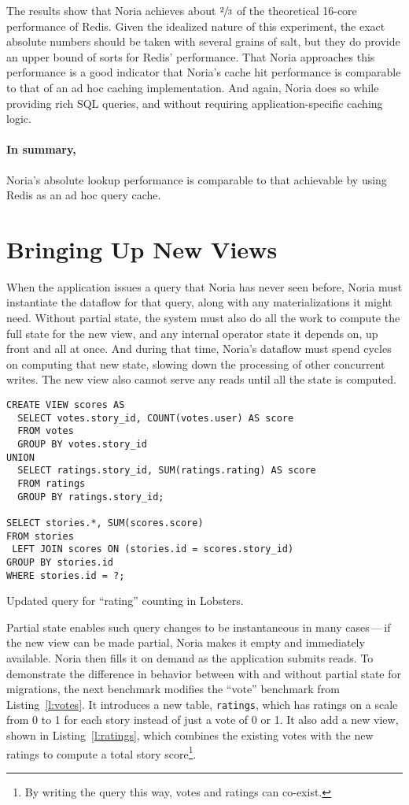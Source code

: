 The results show that Noria achieves about $\sfrac{2}{3}$ of the theoretical
16-core performance of Redis. Given the idealized nature of this experiment, the
exact absolute numbers should be taken with several grains of salt, but they do
provide an upper bound of sorts for Redis' performance. That Noria approaches
this performance is a good indicator that Noria's cache hit performance is
comparable to that of an ad hoc caching implementation. And again, Noria does so
while providing rich SQL queries, and without requiring application-specific
caching logic.

\paragraph{In summary,} Noria's absolute lookup performance is comparable to
that achievable by using Redis as an ad hoc query cache.

\section{Bringing Up New Views}
\label{s:eval:mig}

When the application issues a query that Noria has never seen before, Noria must
instantiate the dataflow for that query, along with any materializations it
might need. Without partial state, the system must also do all the work to
compute the full state for the new view, and any internal operator state it
depends on, up front and all at once. And during that time, Noria's dataflow
must spend cycles on computing that new state, slowing down the processing of
other concurrent writes. The new view also cannot serve any reads until all the
state is computed.

\begin{listing}[h]
  \begin{verbatim}
CREATE VIEW scores AS
  SELECT votes.story_id, COUNT(votes.user) AS score
  FROM votes
  GROUP BY votes.story_id
UNION
  SELECT ratings.story_id, SUM(ratings.rating) AS score
  FROM ratings
  GROUP BY ratings.story_id;

SELECT stories.*, SUM(scores.score)
FROM stories
 LEFT JOIN scores ON (stories.id = scores.story_id)
GROUP BY stories.id
WHERE stories.id = ?;
  \end{verbatim}
  \caption{Updated query for ``rating'' counting in Lobsters.}
  \label{l:ratings}
\end{listing}

Partial state enables such query changes to be instantaneous in many
cases\,---\,if the new view can be made partial, Noria makes it empty and
immediately available. Noria then fills it on demand as the application submits
reads. To demonstrate the difference in behavior between with and without
partial state for migrations, the next benchmark modifies the ``vote'' benchmark
from Listing~\ref{l:votes}. It introduces a new table, \texttt{ratings}, which
has ratings on a scale from 0 to 1 for each story instead of just a vote of 0 or
1. It also add a new view, shown in Listing~\vref{l:ratings}, which combines the
existing votes with the new ratings to compute a total story score\footnote{By
writing the query this way, votes and ratings can co-exist.}.

